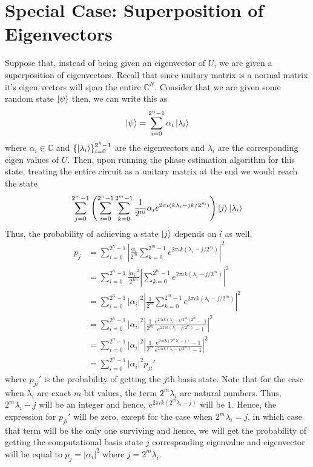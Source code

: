 \section{Special Case: Superposition of Eigenvectors}
Suppose that, instead of being given an eigenvector of $U$, we are given a superposition of eigenvectors. Recall that since unitary matrix is a normal matrix it's eigen vectors will span the entire $\mathbb{C}^N$. Consider that we are given some random state $\ket{\psi}$ then, we can write this as
\[
\ket{\psi}=\sum_{i=0}^{2^n-1} \alpha_i \ket{\lambda_i}
\]
where $\alpha_i \in \mathbb{C}$ and $\{\ket{\lambda_i}\}_{i=0}^{2^n-1}$ are the eigenvectors and $\lambda_i$ are the corresponding eigen values of $U$. Then, upon running the phase estimation algorithm for this state, treating the entire circuit as a unitary matrix at the end we would reach the state
\[
\sum_{j=0}^{2^m-1}\left(\sum_{i=0}^{2^n-1} \sum_{k=0}^{2^m-1}\frac{1}{2^m} \alpha_ie^{2\pi\iota(k\lambda_i-jk/2^m)}\right)\ket{j} \ket{\lambda_i}
\]
Thus, the probability of achieving a state $\ket{j}$ depends on $i$ as well,
\begin{align*}
p_{j}&=\sum_{i=0}^{2^n-1}\left|\frac{\alpha_i}{2^m}\sum_{k=0}^{2^m-1} e^{2\pi\iota k(\lambda_i-j/2^m)}\right|^2\\
&=\sum_{i=0}^{2^n-1}\frac{|\alpha_i|^2
}{2^{2m}} \left|\sum_{k=0}^{2^m-1} e^{2\pi\iota k(\lambda_i-j/2^m)}\right|^2\\
&=\sum_{i=0}^{2^n-1}|\alpha_i|^2 \left|\frac{1}{2^{m}}\sum_{k=0}^{2^m-1} e^{2\pi\iota k(\lambda_i-j/2^m)}\right|^2\\
&=\sum_{i=0}^{2^n-1}|\alpha_i|^2\left|\frac{1}{2^m}\frac{e^{2\pi\iota k(\lambda_i-j/2^m)2^m}-1}{e^{2\pi\iota k(\lambda_i-j/2^m)}-1}\right|^2\\
&=\sum_{i=0}^{2^n-1}|\alpha_i|^2\left|\frac{1}{2^m}\frac{e^{2\pi\iota k(2^m\lambda_i-j)}-1}{e^{2\pi\iota k(\lambda_i-j/2^m)}-1}\right|^2\\
&=\sum_{i=0}^{2^n-1}|\alpha_i|^2 p_{ji}'
\end{align*}
where $p_{ji}'$ is the probability of getting the $j$th basis state. Note that for the case when $\lambda_i$ are exact $m$-bit values, the term $2^m\lambda_i$ are natural numbers. Thus, $2^m\lambda_i-j$ will be an integer and hence, $e^{2\pi\iota k(2^m\lambda_i-j)}$ will be $1$. Hence, the expression for $p_{ji}'$ will be zero, except for the case when $2^m\lambda_i=j$, in which case that term will be the only one surviving and hence, we will get the probability of getting the computational basis state $j$ corresponding eigenvalue and eigenvector will be equal to $p_j=|\alpha_i|^2$ where $j=2^m\lambda_i$.

